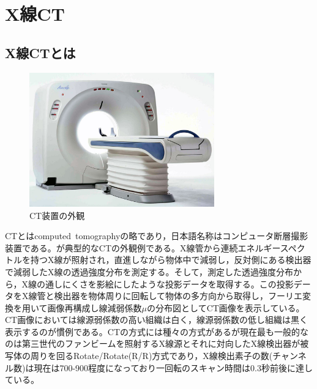 \chapter{X線CT}



\section{X線CTとは}
\begin{figure}
 \begin{center}
 \includegraphics[width=8cm]{image/other/CT_toshiba.eps}
 \end{center}
 \caption{CT装置の外観}
 \label{fig:CT_toshiba}
\end{figure}
CTとはcomputed\ tomographyの略であり，日本語名称はコンピュータ断層撮影装置である。が典型的なCTの外観例である。X線管から連続エネルギースペクトルを持つX線が照射され，直進しながら物体中で減弱し，反対側にある検出器で減弱したX線の透過強度分布を測定する。そして，測定した透過強度分布から，X線の通しにくさを影絵にしたような投影データを取得する。この投影データをX線管と検出器を物体周りに回転して物体の多方向から取得し，フーリエ変換を用いて画像再構成し線減弱係数$\mu$の分布図としてCT画像を表示している。CT画像においては線源弱係数の高い組織は白く，線源弱係数の低し組織は黒く表示するのが慣例である。CTの方式には種々の方式があるが現在最も一般的なのは第三世代のファンビームを照射するX線源とそれに対向したX線検出器が被写体の周りを回るRotate/Rotate(R/R)方式であり，X線検出素子の数(チャンネル数)は現在は700-900程度になっており一回転のスキャン時間は0.3秒前後に達している。\\


